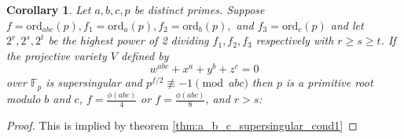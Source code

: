 \documentclass{article}
\newcommand{\F}{\mathbb{F}}
\newcommand{\ord}[0]{\mathrm{ord}}
\newtheorem{corollary}{Corollary}[theorem]
\theoremstyle{definition}
\theoremstyle{definition}
\theoremstyle{remark}
\begin{document}
\begin{corollary} \label{thm:a_b_c_supersingular_cond2}
Let $a,b,c,p$ be distinct primes. Suppose $f = \ord_{abc}(p), f_1 = \ord_a(p), f_2 = \ord_b(p),$ and $f_3 = \ord_c(p)$ and let $2^r, 2^s, 2^t$ be the highest power of 2 dividing $f_1, f_2, f_3$ respectively with $r \ge s \ge t$. If the projective variety $V$ defined by
\[w^{abc} + x^a + y^b + z^c =0\]
over $\F_p$ is supersingular and $p^{f/2} \not\equiv -1 \pmod{abc}$ then $p$ is a primitive root modulo $b$ and $c$, $f = \frac{\phi(abc)}{4}$ or $f = \frac{\phi(abc)}{8}$, and $r > s$:
\end{corollary}
\begin{proof}
This is implied by theorem \ref{thm:a_b_c_supersingular_cond1}
\end{proof}
\end{document}
